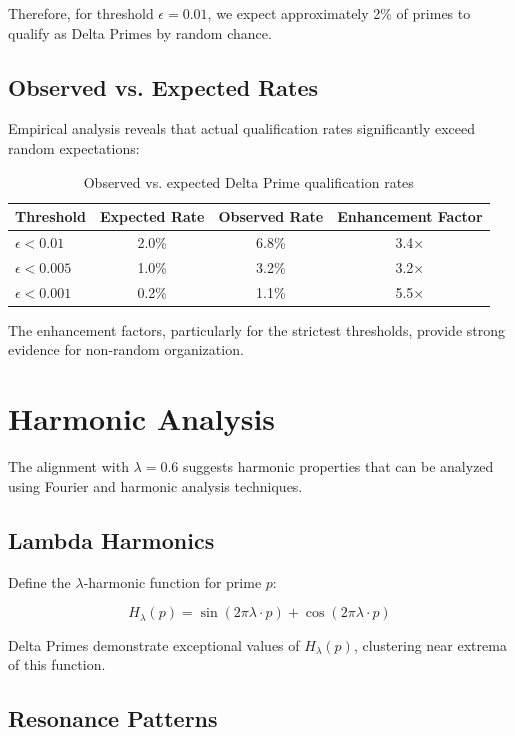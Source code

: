 \documentclass[12pt,a4paper]{report}
\newcommand{\lambdaval}{\lambda}
\begin{document}
Therefore, for threshold $\epsilon = 0.01$, we expect approximately 2\% of primes to qualify as Delta Primes by random chance.

\subsection{Observed vs. Expected Rates}

Empirical analysis reveals that actual qualification rates significantly exceed random expectations:

\begin{table}[h]
\centering
\begin{tabular}{|l|c|c|c|}
\hline
\textbf{Threshold} & \textbf{Expected Rate} & \textbf{Observed Rate} & \textbf{Enhancement Factor} \\
\hline
$\epsilon < 0.01$ & 2.0\% & 6.8\% & 3.4× \\
$\epsilon < 0.005$ & 1.0\% & 3.2\% & 3.2× \\
$\epsilon < 0.001$ & 0.2\% & 1.1\% & 5.5× \\
\hline
\end{tabular}
\caption{Observed vs. expected Delta Prime qualification rates}
\end{table}

The enhancement factors, particularly for the strictest thresholds, provide strong evidence for non-random organization.

\section{Harmonic Analysis}

The alignment with $\lambdaval = 0.6$ suggests harmonic properties that can be analyzed using Fourier and harmonic analysis techniques.

\subsection{Lambda Harmonics}

Define the $\lambdaval$-harmonic function for prime $p$:

\[
H_\lambdaval(p) = \sin(2\pi \lambdaval \cdot p) + \cos(2\pi \lambdaval \cdot p)
\]

Delta Primes demonstrate exceptional values of $H_\lambdaval(p)$, clustering near extrema of this function.

\subsection{Resonance Patterns}
\end{document}

